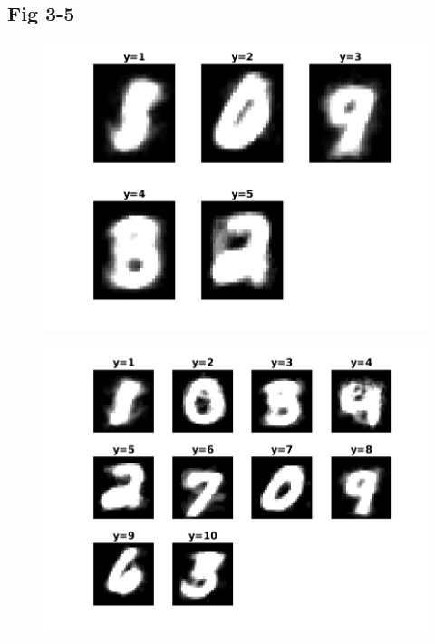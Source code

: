 \documentclass{article}
\begin{document}
\subsection{Fig 3-5}
\begin{figure}[h!]
\begin{multicols}{3}
\includegraphics[width=1\columnwidth]{RunResults2/3.png}
\label{3}

\includegraphics[width=1\columnwidth]{RunResults2/4.png}
\label{4}


\end{multicols}
\end{figure}
\end{document}

